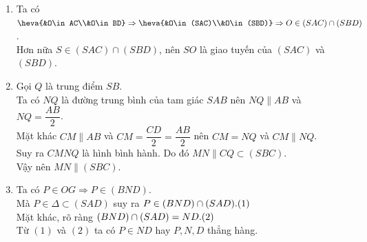 \begin{bt}
\begin{bt}
{\begin{center}
\end{center}
\begin{enumerate}
\item Ta có $\heva{&O\in AC\\&O\in BD}\Rightarrow \heva{&O\in (SAC)\\&O\in (SBD)}\Rightarrow O \in (SAC)\cap (SBD)$.\\
Hơn nữa $S \in (SAC)\cap (SBD)$, nên $SO$ là giao tuyến của $(SAC)$ và $(SBD)$.
\item Gọi $Q$ là trung điểm $SB$.\\
Ta có $NQ$ là đường trung bình của tam giác $SAB$ nên $NQ \parallel AB$ và $NQ = \dfrac{AB}{2}$.\\
Mặt khác $CM \parallel AB$ và $CM = \dfrac{CD}{2}=\dfrac{AB}{2}$ nên $CM = NQ$ và $CM \parallel NQ$.\\
Suy ra $CMNQ$ là hình bình hành. Do đó $MN \parallel CQ \subset (SBC)$.\\
Vậy nên $MN \parallel (SBC)$.
\item Ta có $P \in OG \Rightarrow P \in (BND)$.\\
Mà $P \in \Delta \subset (SAD)$ suy ra $P\in (BND) \cap (SAD). \hfill (1)$\\
Mặt khác, rõ ràng $(BND) \cap (SAD) = ND. \hfill (2)$\\
Từ $(1)$ và $(2)$ ta có $P \in ND$ hay $P,N,D$ thẳng hàng.\vspace{-1cm}
\end{enumerate}
}
\end{bt}


\end{bt}
